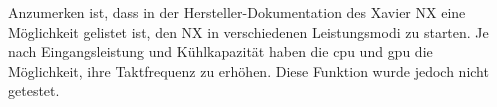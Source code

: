 Anzumerken ist, dass in der Hersteller-Dokumentation des Xavier NX eine Möglichkeit gelistet ist,
den NX in verschiedenen Leistungsmodi zu starten.
Je nach Eingangsleistung und Kühlkapazität haben die \gls{cpu} und \gls{gpu} die Möglichkeit, ihre
Taktfrequenz zu erhöhen.
Diese Funktion wurde jedoch nicht getestet.
